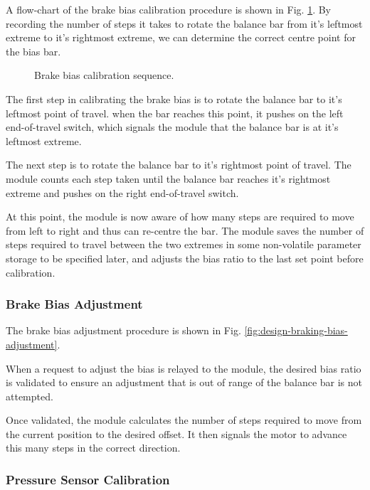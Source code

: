 A flow-chart of the brake bias calibration procedure is shown in Fig. \ref{fig:brake_bias_calibration_flow}. By recording the number of steps it takes to rotate the balance bar from it's leftmost extreme to it's rightmost extreme, we can determine the correct centre point for the bias bar. 

\begin{figure}[H]
\centering

\caption{Brake bias calibration sequence.}
\label{fig:brake_bias_calibration_flow}
\end{figure}

The first step in calibrating the brake bias is to rotate the balance bar to it's leftmost point of travel. when the bar reaches this point, it pushes on the left end-of-travel switch, which signals the module that the balance bar is at it's leftmost extreme. 

The next step is to rotate the balance bar to it's rightmost point of travel. The module counts each step taken until the balance bar reaches it's rightmost extreme and pushes on the right end-of-travel switch.

At this point, the module is now aware of how many steps are required to move from left to right and thus can re-centre the bar. The module saves the number of steps required to travel between the two extremes in some non-volatile parameter storage to be specified later, and adjusts the bias ratio to the last set point before calibration.

\subsubsection{Brake Bias Adjustment}

The brake bias adjustment procedure is shown in Fig. \ref{fig:design-braking-bias-adjustment}. 

When a request to adjust the bias is relayed to the module, the desired bias ratio is validated to ensure an adjustment that is out of range of the balance bar is not attempted. 

Once validated, the module calculates the number of steps required to move from the current position to the desired offset. It then signals the motor to advance this many steps in the correct direction.

\subsubsection{Pressure Sensor Calibration}

